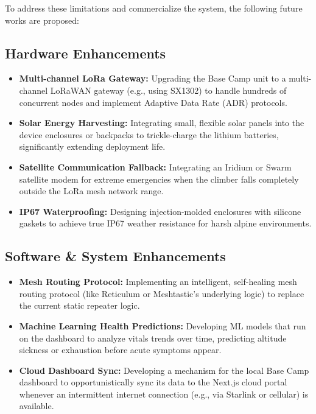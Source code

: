 To address these limitations and commercialize the system, the following future works are proposed:

\subsection{Hardware Enhancements}
\begin{itemize}
    \item \textbf{Multi-channel LoRa Gateway:} Upgrading the Base Camp unit to a multi-channel LoRaWAN gateway (e.g., using SX1302) to handle hundreds of concurrent nodes and implement Adaptive Data Rate (ADR) protocols.
    \item \textbf{Solar Energy Harvesting:} Integrating small, flexible solar panels into the device enclosures or backpacks to trickle-charge the lithium batteries, significantly extending deployment life.
    \item \textbf{Satellite Communication Fallback:} Integrating an Iridium or Swarm satellite modem for extreme emergencies when the climber falls completely outside the LoRa mesh network range.
    \item \textbf{IP67 Waterproofing:} Designing injection-molded enclosures with silicone gaskets to achieve true IP67 weather resistance for harsh alpine environments.
\end{itemize}

\subsection{Software \& System Enhancements}
\begin{itemize}
    \item \textbf{Mesh Routing Protocol:} Implementing an intelligent, self-healing mesh routing protocol (like Reticulum or Meshtastic's underlying logic) to replace the current static repeater logic.
    \item \textbf{Machine Learning Health Predictions:} Developing ML models that run on the dashboard to analyze vitals trends over time, predicting altitude sickness or exhaustion before acute symptoms appear.
    \item \textbf{Cloud Dashboard Sync:} Developing a mechanism for the local Base Camp dashboard to opportunistically sync its data to the Next.js cloud portal whenever an intermittent internet connection (e.g., via Starlink or cellular) is available.
\end{itemize}
